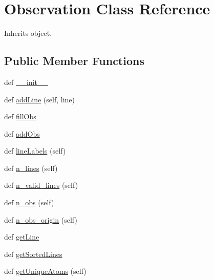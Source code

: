 \hypertarget{classpyneb_1_1core_1_1pynebcore_1_1_observation}{}\section{Observation Class Reference}
\label{classpyneb_1_1core_1_1pynebcore_1_1_observation}


Inherits object.

\subsection*{Public Member Functions}
\begin{DoxyCompactItemize}
\item 
def \hyperlink{classpyneb_1_1core_1_1pynebcore_1_1_observation_ac775ee34451fdfa742b318538164070e}{\+\_\+\+\_\+init\+\_\+\+\_\+}
\item 
def \hyperlink{classpyneb_1_1core_1_1pynebcore_1_1_observation_af43492682b3c00ceed4d03bae1960de9}{add\+Line} (self, line)
\item 
def \hyperlink{classpyneb_1_1core_1_1pynebcore_1_1_observation_a4022c20cf3949b26f8941e4591ea1f68}{fill\+Obs}
\item 
def \hyperlink{classpyneb_1_1core_1_1pynebcore_1_1_observation_ada122b7940c9876783a28ae85efb978b}{add\+Obs}
\item 
def \hyperlink{classpyneb_1_1core_1_1pynebcore_1_1_observation_a03be73a7d4d6729c61f26d26123c0ede}{line\+Labels} (self)
\item 
def \hyperlink{classpyneb_1_1core_1_1pynebcore_1_1_observation_a79b46ea822694ff954a3ac4250e2c65a}{n\+\_\+lines} (self)
\item 
def \hyperlink{classpyneb_1_1core_1_1pynebcore_1_1_observation_a666e36fd80adee4e9192a38298b78c63}{n\+\_\+valid\+\_\+lines} (self)
\item 
def \hyperlink{classpyneb_1_1core_1_1pynebcore_1_1_observation_a65807765d803235b5e1884501f8d6cba}{n\+\_\+obs} (self)
\item 
def \hyperlink{classpyneb_1_1core_1_1pynebcore_1_1_observation_a163adfcb27fa6e9495f07acbec5a4606}{n\+\_\+obs\+\_\+origin} (self)
\item 
def \hyperlink{classpyneb_1_1core_1_1pynebcore_1_1_observation_a22f7664b820991e5f16a0e95facb117d}{get\+Line}
\item 
def \hyperlink{classpyneb_1_1core_1_1pynebcore_1_1_observation_aed6ad0861782470233b395c81ad2e24a}{get\+Sorted\+Lines}
\item 
def \hyperlink{classpyneb_1_1core_1_1pynebcore_1_1_observation_afed5c14d1afc82e372b10417b942fe68}{get\+Unique\+Atoms} (self)

\end{DoxyCompactItemize}

